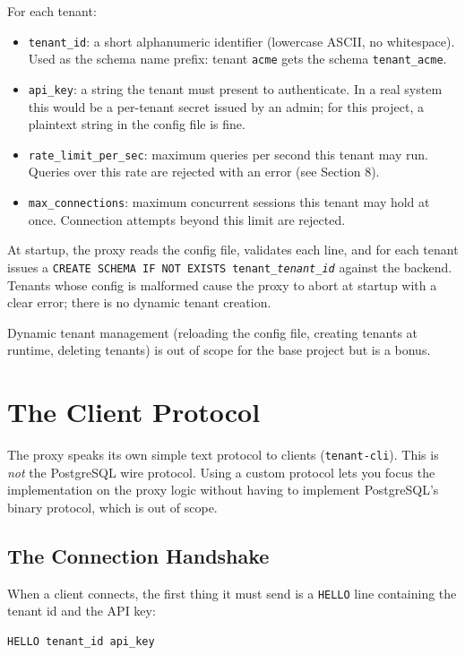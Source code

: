 \documentclass[11pt,a4paper]{article}
\begin{document}
For each tenant:
\begin{itemize}
\item \texttt{tenant\_id}: a short alphanumeric identifier (lowercase ASCII, no whitespace). Used as the schema name prefix: tenant \texttt{acme} gets the schema \texttt{tenant\_acme}.
\item \texttt{api\_key}: a string the tenant must present to authenticate. In a real system this would be a per-tenant secret issued by an admin; for this project, a plaintext string in the config file is fine.
\item \texttt{rate\_limit\_per\_sec}: maximum queries per second this tenant may run. Queries over this rate are rejected with an error (see Section 8).
\item \texttt{max\_connections}: maximum concurrent sessions this tenant may hold at once. Connection attempts beyond this limit are rejected.
\end{itemize}

At startup, the proxy reads the config file, validates each line, and for each tenant issues a \texttt{CREATE SCHEMA IF NOT EXISTS tenant\_\textit{tenant\_id}} against the backend. Tenants whose config is malformed cause the proxy to abort at startup with a clear error; there is no dynamic tenant creation.

Dynamic tenant management (reloading the config file, creating tenants at runtime, deleting tenants) is out of scope for the base project but is a bonus.

\section{The Client Protocol}

The proxy speaks its own simple text protocol to clients (\texttt{tenant-cli}). This is \textit{not} the PostgreSQL wire protocol. Using a custom protocol lets you focus the implementation on the proxy logic without having to implement PostgreSQL's binary protocol, which is out of scope.

\subsection{The Connection Handshake}
When a client connects, the first thing it must send is a \texttt{HELLO} line containing the tenant id and the API key:

\begin{codebox}
\begin{lstlisting}
HELLO tenant_id api_key
\end{lstlisting}
\end{codebox}
\end{document}
